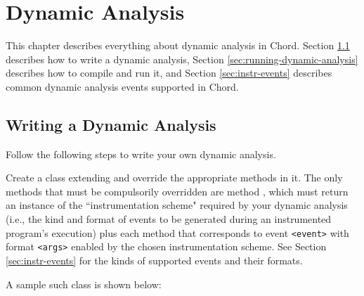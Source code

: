 \chapter{Dynamic Analysis}
\label{chap:dynamic-analysis}

This chapter describes everything about dynamic analysis in Chord.
Section \ref{sec:writing-dynamic-analysis} describes how to write a dynamic analysis,
Section \ref{sec:running-dynamic-analysis} describes how to compile and run it,
and Section \ref{sec:instr-events} describes common dynamic analysis events
supported in Chord.

\section{Writing a Dynamic Analysis}
\label{sec:writing-dynamic-analysis}

Follow the following steps to write your own dynamic analysis.

Create a class extending  and override
the appropriate methods in it.
The only methods that must be compulsorily overridden are method ,
which must return an instance of the ``instrumentation scheme" required by
your dynamic analysis (i.e., the kind and format of events to be generated during an
instrumented program's execution)
plus each  method that corresponds to event {\tt <event>}
with format {\tt <args>} enabled by the chosen instrumentation scheme.
See Section \ref{sec:instr-events} for the kinds of supported events and their formats.

A sample such class  is shown below:

